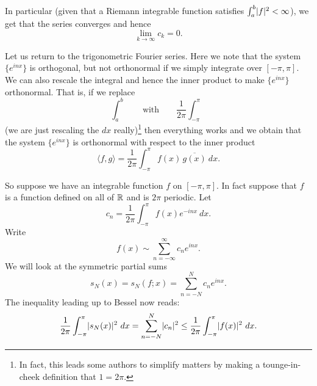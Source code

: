 In particular (given that a Riemann integrable function satisfies
$\int_a^b \lvert {f} \rvert^2 < \infty$), we get that the series
converges and hence
\begin{equation*}
\lim_{k \to \infty} c_k = 0 .
\end{equation*}


Let us return to the trigonometric Fourier series.  Here we note that the
system $\{ e^{inx} \}$ is orthogonal, but not orthonormal if we simply
integrate over $[-\pi,\pi]$.  We can also rescale the integral
and hence the inner product to make 
$\{ e^{inx} \}$ orthonormal.  That is, if we replace
\begin{equation*}
\int_a^b \qquad \text{with} \qquad
\frac{1}{2\pi} \int_{-\pi}^\pi
\end{equation*}
(we are just rescaling the $dx$ really)\footnote{%
In fact, this leads some authors to simplify matters by
making a tounge-in-cheek definition that $1=2\pi$.}
then everything works and we obtain that the system $\{ e^{inx} \}$
is orthonormal with respect to the inner product
\begin{equation*}
\langle f , g \rangle =
\frac{1}{2\pi} \int_{-\pi}^\pi f(x) \, \overline{g(x)} ~ dx .
\end{equation*}

So suppose we have an integrable function $f$ on $[-\pi,\pi]$.  In fact
suppose
that $f$ is a function defined on all of ${\mathbb{R}}$ and is $2\pi$ periodic.
Let
\begin{equation*}
c_n = 
\frac{1}{2\pi} \int_{-\pi}^\pi
f(x) e^{-inx} ~ dx .
\end{equation*}
Write
\begin{equation*}
f(x) \sim
\sum_{n=-\infty}^\infty c_n e^{inx} .
\end{equation*}
We will look at the symmetric partial sums
\begin{equation*}
s_N(x) = s_N(f;x) = 
\sum_{n=-N}^N c_n e^{inx} .
\end{equation*}
The inequality leading up to Bessel now reads:
\begin{equation*}
\frac{1}{2\pi} \int_{-\pi}^\pi
\lvert {s_N(x)} \rvert^2 ~ dx =
\sum_{n=-N}^N \lvert {c_n} \rvert^2
\leq
\frac{1}{2\pi} \int_{-\pi}^\pi
\lvert {f(x)} \rvert^2
~ dx .
\end{equation*}

